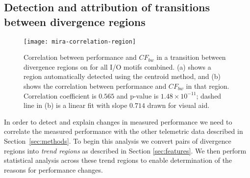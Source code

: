 \subsection{Detection and attribution of transitions between divergence regions} \label{sec:results/transitions}

\begin{figure}
    \centering
    \texttt{[image: mira-correlation-region]}
    \vspace{-.35in}
    \caption{Correlation between performance and $CF_{bw}$ in a transition between divergence regions on \mira for all I/O motifs combined.
    (a) shows a region automatically detected using the centroid method, and (b) shows the correlation between performance and $CF_{bw}$ in that region.
    Correlation coefficient is $0.565$ and p-value is ${1.48 \times 10^{-11}}$; dashed line in (b) is a linear fit with slope $0.714$ drawn for visual aid.}
    \label{fig:mira-correlation-region}
\end{figure}


In order to detect and explain changes in measured performance we need to correlate the measured performance with the other telemetric data described in Section~\ref{sec:methods}. To begin this analysis we convert pairs of divergence regions into \emph{trend regions} as described in Section \ref{sec:features}. We then perform statistical analysis across these trend regions to enable determination of the reasons for performance changes. 

%
%

